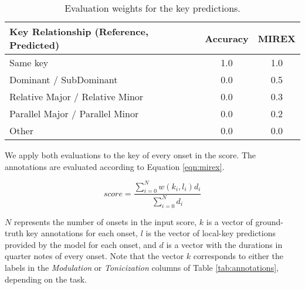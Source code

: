 \documentclass[sigconf]{acmart}
\begin{document}

\begin{table}[h]
  \caption{Evaluation weights for the key predictions.}
  \label{tab:mirexscore}
  \begin{tabular}{l|cc}
    \toprule
    Key Relationship (Reference, Predicted) & Accuracy & MIREX\\
    \midrule
    Same key & 1.0 & 1.0 \\
    Dominant / SubDominant & 0.0 & 0.5 \\
    Relative Major / Relative Minor & 0.0 & 0.3 \\
    Parallel Major / Parallel Minor & 0.0 & 0.2 \\
    Other & 0.0 & 0.0 \\
    \bottomrule
\end{tabular}
\end{table}

We apply both evaluations to the key of every onset in the score. 
The annotations are evaluated according to Equation \ref{eqn:mirex}.

\begin{equation}
    \label{eqn:mirex}
    \mathit{score} = \frac{\sum_{i=0}^{N} \mathit{w(k_i, l_i) d_i}}{\sum_{i=0}^{N} d_i}
\end{equation}

$N$ represents the number of onsets in the input score, $k$ is a vector of ground-truth key annotations for each onset, $l$ is the vector of local-key predictions provided by the model for each onset, and $d$ is a vector with the durations in quarter notes of every onset.
Note that the vector $k$ corresponds to either the labels in the \emph{Modulation} or \emph{Tonicization} columns of Table \ref{tab:annotations}, depending on the task.
 
\end{document}
